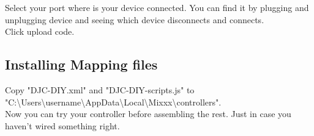 \documentclass[12pt, a4paper]{article}
\begin{document}
			\noindent Select your port where is your device connected. You can find it by plugging and unplugging device and seeing which device disconnects and connects. \\
			
			\noindent Click upload code. \\
			
		\subsection{Installing Mapping files}
			\noindent Copy "DJC-DIY.xml" and "DJC-DIY-scripts.js" to \\ "C:\textbackslash{}Users\textbackslash{}username\textbackslash{}AppData\textbackslash{}Local\textbackslash{}Mixxx\textbackslash{}controllers". \\
			
			\noindent Now you can try your controller before assembling the rest. Just in case you haven't wired something right.
	
\end{document}
